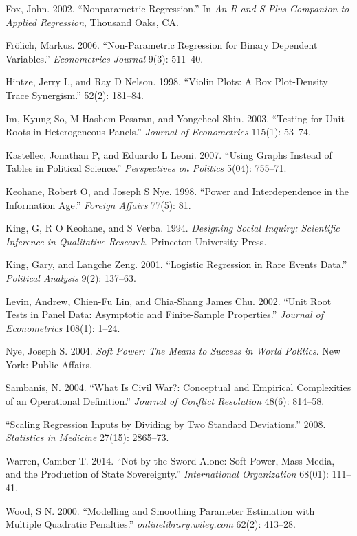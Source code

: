 \documentclass[11pt,article,oneside]{memoir}
\begin{document}
Fox, John. 2002. ``Nonparametric Regression.'' In \emph{An R and S-Plus
Companion to Applied Regression}, Thousand Oaks, CA.

Fr{ö}lich, Markus. 2006. ``Non-Parametric Regression for Binary
Dependent Variables.'' \emph{Econometrics Journal} 9(3): 511--40.

Hintze, Jerry L, and Ray D Nelson. 1998. ``Violin Plots: A Box
Plot-Density Trace Synergism.'' 52(2): 181--84.

Im, Kyung So, M Hashem Pesaran, and Yongcheol Shin. 2003. ``Testing for
Unit Roots in Heterogeneous Panels.'' \emph{Journal of Econometrics}
115(1): 53--74.

Kastellec, Jonathan P, and Eduardo L Leoni. 2007. ``Using Graphs Instead
of Tables in Political Science.'' \emph{Perspectives on Politics} 5(04):
755--71.

Keohane, Robert O, and Joseph S Nye. 1998. ``Power and Interdependence
in the Information Age.'' \emph{Foreign Affairs} 77(5): 81.

King, G, R O Keohane, and S Verba. 1994. \emph{Designing Social Inquiry:
Scientific Inference in Qualitative Research}. Princeton University
Press.

King, Gary, and Langche Zeng. 2001. ``Logistic Regression in Rare Events
Data.'' \emph{Political Analysis} 9(2): 137--63.

Levin, Andrew, Chien-Fu Lin, and Chia-Shang James Chu. 2002. ``Unit Root
Tests in Panel Data: Asymptotic and Finite-Sample Properties.''
\emph{Journal of Econometrics} 108(1): 1--24.

Nye, Joseph S. 2004. \emph{Soft Power: The Means to Success in World
Politics}. New York: Public Affairs.

Sambanis, N. 2004. ``What Is Civil War?: Conceptual and Empirical
Complexities of an Operational Definition.'' \emph{Journal of Conflict
Resolution} 48(6): 814--58.

``Scaling Regression Inputs by Dividing by Two Standard Deviations.''
2008. \emph{Statistics in Medicine} 27(15): 2865--73.

Warren, Camber T. 2014. ``Not by the Sword Alone: Soft Power, Mass
Media, and the Production of State Sovereignty.'' \emph{International
Organization} 68(01): 111--41.

Wood, S N. 2000. ``Modelling and Smoothing Parameter Estimation with
Multiple Quadratic Penalties.'' \emph{onlinelibrary.wiley.com} 62(2):
413--28.
\end{document}
